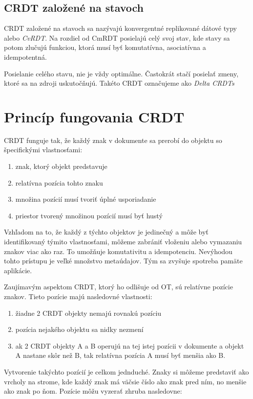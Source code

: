 \subsection{CRDT založené na stavoch}
CRDT založené na stavoch sa nazývajú konvergentné replikované dátové typy alebo \textit{CvRDT}.
Na rozdiel od CmRDT posielajú celý svoj stav, kde stavy sa potom zlučujú funkciou,
ktorá musí byť komutatívna, asociatívna a idempotentná.

Posielanie celého stavu, nie je vždy optimálne. Častokrát stačí posielať zmeny, ktoré sa na zdroji
uskutočňujú. Takéto CRDT označujeme ako \textit{Delta CRDTs}

\section{Princíp fungovania CRDT}
CRDT funguje tak, že každý znak v dokumente sa prerobí do objektu so špecifickými vlastnosťami:
\begin{enumerate}
  \label{def_pozicie}
  \item znak, ktorý objekt predstavuje
  \item relatívna pozícia tohto znaku
  \item množina pozícií musí tvoriť úplné usporiadanie
  \item priestor tvorený množinou pozícií musí byť hustý
\end{enumerate}
Vzhľadom na to, že každý z týchto objektov je jedinečný a môže byť identifikovaný
týmito vlastnosťami, môžeme zabrániť vloženiu alebo vymazaniu znakov viac ako raz.
To umožňuje komutativitu a idempotenciu. Nevýhodou tohto prístupu je veľké množstvo metaúdajov.
Tým sa zvyšuje spotreba pamäte aplikácie.

Zaujímavým aspektom CRDT, ktorý ho odlišuje od OT, sú relatívne pozície znakov. Tieto pozície majú
nasledovné vlastnosti:
\begin{enumerate}
  \item žiadne 2 CRDT objekty nemajú rovnakú pozíciu
  \item pozícia nejakého objektu sa nidky nezmení
  \item ak 2 CRDT objekty A a B operujú na tej istej pozícii v dokumente a objekt A
  nastane skôr než B, tak relatívna pozícia A musí byť menšia ako B.
\end{enumerate}
Vytvorenie takýchto pozícií je celkom jednduché.
Znaky si môžeme predstaviť ako vrcholy na strome, kde každý znak má väčsie číslo ako znak pred
ním, no menšie ako znak po ňom. Pozície môžu vyzerať zhruba nasledovne:

